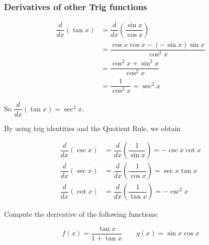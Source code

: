 \documentclass[14pt]{beamer}
\begin{document}
\begin{frame}

\frametitle{Derivatives of other Trig functions}
\small
\begin{align*}
\dfrac{d}{dx}(\tan x)&=\dfrac{d}{dx} \left( \dfrac{\sin x}{\cos x}\right) \\
 &= \dfrac{\cos x \cos x - (-\sin x)\sin x }{\cos^2 x} \\
&= \dfrac{\cos^2 x + \sin^2 x}{\cos^2 x} \\
&= \dfrac{1}{\cos^2 x} = \sec^2 x
\end{align*}

So $\dfrac{d}{dx} (\tan x)=\sec^2 x.$

\end{frame}

\begin{frame}

By using trig identities and the Quotient Rule, we obtain

\begin{align*}
\dfrac{d}{dx} (\csc x) &= \dfrac{d}{dx} \left( \dfrac{1}{\sin x}\right) = -\csc x \cot x \\
\dfrac{d}{dx} (\sec x) &= \dfrac{d}{dx} \left( \dfrac{1}{\cos x}\right) = \sec x \tan x \\
\dfrac{d}{dx} (\cot x) &= \dfrac{d}{dx} \left( \dfrac{1}{\tan x}\right) = -\csc^2 x  
\end{align*}

\end{frame}

\begin{frame}%
\begin{exe} Compute the derivative of the following functions:

$$f(x)=\frac{\tan x}{1+\tan x} \qquad g(x)=\sin x \cos x$$

\end{exe}
\end{frame}
\end{document}
